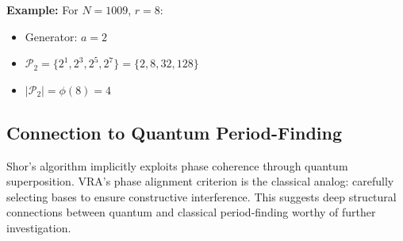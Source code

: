 \textbf{Example:} For $N=1009$, $r=8$:
\begin{itemize}
    \item Generator: $a=2$
    \item $\mathcal{P}_2 = \{2^1, 2^3, 2^5, 2^7\} = \{2, 8, 32, 128\}$
    \item $|\mathcal{P}_2| = \phi(8) = 4$
\end{itemize}

\subsection{Connection to Quantum Period-Finding}

Shor's algorithm implicitly exploits phase coherence through quantum superposition. VRA's phase alignment criterion is the classical analog: carefully selecting bases to ensure constructive interference. This suggests deep structural connections between quantum and classical period-finding worthy of further investigation.
